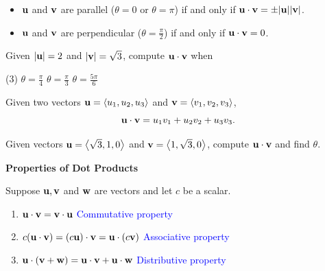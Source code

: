\documentclass[mathNotesPreamble]{subfiles}
\begin{document}
  \begin{itemize}
    \item ${\mathbf{u}}$ and ${\mathbf{v}}$ are parallel ($\theta=0$ or $\theta=\pi$) if and only if ${\mathbf{u}}\cdot{\mathbf{v}}=\pm{\left\vert{\mathbf{u}}\right\vert}{\left\vert{\mathbf{v}}\right\vert}$.
    \item ${\mathbf{u}}$ and ${\mathbf{v}}$ are perpendicular ($\theta=\frac{\pi}{2}$) if and only if ${\mathbf{u}}\cdot{\mathbf{v}}=0$.
  \end{itemize}

  \begin{ex*}
    Given ${\left\vert{\mathbf{u}}\right\vert}=2$ and ${\left\vert{\mathbf{v}}\right\vert}=\sqrt 3$, compute ${\mathbf{u}}\cdot{\mathbf{v}}$ when
      \begin{tasks}[after-item-skip=\stretch{1}, label=\textbullet](3)
        \task $\theta=\frac{\pi}{4}$
        \task $\theta=\frac{\pi}{3}$
        \task $\theta=\frac{5\pi}{6}$
      \end{tasks}
  \end{ex*}

  \begin{thmBox*}
    
    Given two vectors ${\mathbf{u}}={\left\langle u_1,u_2,u_3 \right\rangle}$ and ${\mathbf{v}}={\left\langle v_1,v_2,v_3 \right\rangle}$, 
      \[{\mathbf{u}}\cdot{\mathbf{v}}=u_1v_1+u_2v_2+u_3v_3.\]
  \end{thmBox*}
  
  \begin{ex*}
    Given vectors ${\mathbf{u}}={\left\langle \sqrt3,1,0 \right\rangle}$ and ${\mathbf{v}}={\left\langle 1,\sqrt3,0 \right\rangle}$, compute ${\mathbf{u}}\cdot{\mathbf{v}}$ and find $\theta$.
  \end{ex*}
  \pagebreak

  \textbf{Properties of Dot Products}
  
  \begin{thmBox*}
    Suppose ${\mathbf{u}}, {\mathbf{v}}$ and ${\mathbf{w}}$ are vectors and let $c$ be a scalar.
    \begin{center}
      \begin{minipage}{0.7\linewidth}
        \begin{enumerate}
          \item 
            ${\mathbf{u}}\cdot {\mathbf{v}} ={\mathbf{v}}\cdot{\mathbf{u}}$ 
            \tab \textcolor{blue}{Commutative property}
          \item 
            $c{\left({\mathbf{u}}\cdot{\mathbf{v}}\right)}={\left(c{\mathbf{u}}\right)}\cdot {\mathbf{v}}={\mathbf{u}}\cdot{\left(c{\mathbf{v}}\right)}$
            \tab \textcolor{blue}{Associative property}
          \item 
            ${\mathbf{u}}\cdot{\left({\mathbf{v}}+{\mathbf{w}}\right)}={\mathbf{u}}\cdot{\mathbf{v}}+{\mathbf{u}}\cdot{\mathbf{w}}$
            \tab \textcolor{blue}{Distributive property}
        \end{enumerate}
      \end{minipage}
    \end{center}
  \end{thmBox*}
\end{document}
